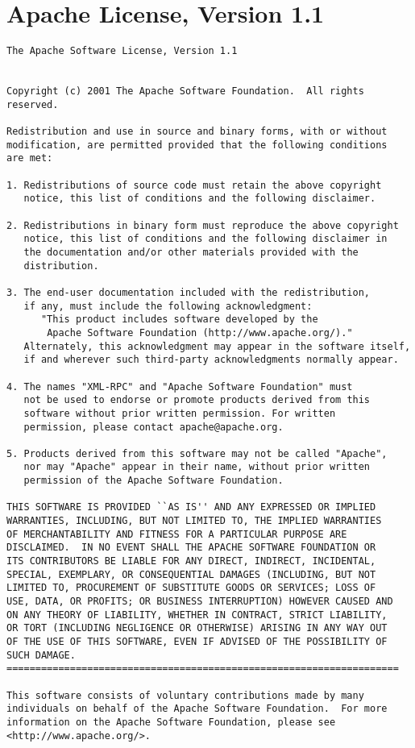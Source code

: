 \documentclass{InsightBook}
\begin{document}
\section{Apache License, Version 1.1}
\begin{verbatim}
The Apache Software License, Version 1.1


Copyright (c) 2001 The Apache Software Foundation.  All rights
reserved.

Redistribution and use in source and binary forms, with or without
modification, are permitted provided that the following conditions
are met:

1. Redistributions of source code must retain the above copyright
   notice, this list of conditions and the following disclaimer.

2. Redistributions in binary form must reproduce the above copyright
   notice, this list of conditions and the following disclaimer in
   the documentation and/or other materials provided with the
   distribution.

3. The end-user documentation included with the redistribution,
   if any, must include the following acknowledgment:
      "This product includes software developed by the
       Apache Software Foundation (http://www.apache.org/)."
   Alternately, this acknowledgment may appear in the software itself,
   if and wherever such third-party acknowledgments normally appear.

4. The names "XML-RPC" and "Apache Software Foundation" must
   not be used to endorse or promote products derived from this
   software without prior written permission. For written
   permission, please contact apache@apache.org.

5. Products derived from this software may not be called "Apache",
   nor may "Apache" appear in their name, without prior written
   permission of the Apache Software Foundation.

THIS SOFTWARE IS PROVIDED ``AS IS'' AND ANY EXPRESSED OR IMPLIED
WARRANTIES, INCLUDING, BUT NOT LIMITED TO, THE IMPLIED WARRANTIES
OF MERCHANTABILITY AND FITNESS FOR A PARTICULAR PURPOSE ARE
DISCLAIMED.  IN NO EVENT SHALL THE APACHE SOFTWARE FOUNDATION OR
ITS CONTRIBUTORS BE LIABLE FOR ANY DIRECT, INDIRECT, INCIDENTAL,
SPECIAL, EXEMPLARY, OR CONSEQUENTIAL DAMAGES (INCLUDING, BUT NOT
LIMITED TO, PROCUREMENT OF SUBSTITUTE GOODS OR SERVICES; LOSS OF
USE, DATA, OR PROFITS; OR BUSINESS INTERRUPTION) HOWEVER CAUSED AND
ON ANY THEORY OF LIABILITY, WHETHER IN CONTRACT, STRICT LIABILITY,
OR TORT (INCLUDING NEGLIGENCE OR OTHERWISE) ARISING IN ANY WAY OUT
OF THE USE OF THIS SOFTWARE, EVEN IF ADVISED OF THE POSSIBILITY OF
SUCH DAMAGE.
====================================================================

This software consists of voluntary contributions made by many
individuals on behalf of the Apache Software Foundation.  For more
information on the Apache Software Foundation, please see
<http://www.apache.org/>.
\end{verbatim}
\end{document}
